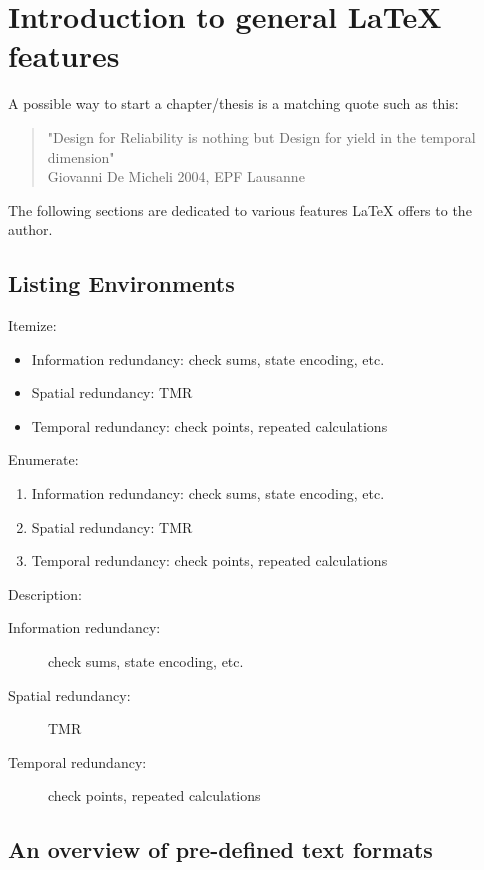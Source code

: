
\thispagestyle{empty}
%
\chapter{Introduction to general \LaTeX{} features}
\label{chap:introduction}

A possible way to start a chapter/thesis is a matching quote such as this:

\begin{quote}
  "Design for Reliability is nothing but Design for yield in the
  temporal dimension"\\
  Giovanni De Micheli 2004, EPF Lausanne
\end{quote}

The following sections are dedicated to various features \LaTeX{} offers to the author.

\section{Listing Environments}
\label{sec:listingenvironments}

Itemize:
\begin{itemize}
	\item Information redundancy: check sums, state encoding, etc.
	\item Spatial redundancy: TMR
	\item Temporal redundancy: check points, repeated calculations
\end{itemize}

\medskip

Enumerate:
\begin{enumerate}
	\item Information redundancy: check sums, state encoding, etc.
	\item Spatial redundancy: TMR
	\item Temporal redundancy: check points, repeated calculations
\end{enumerate}

\medskip

Description:
\begin{description}
	\item[Information redundancy:] check sums, state encoding, etc.
	\item[Spatial redundancy:] TMR
	\item[Temporal redundancy:] check points, repeated calculations
\end{description}

\section{An overview of pre-defined text formats}
\label{sec:overview_textformats}

